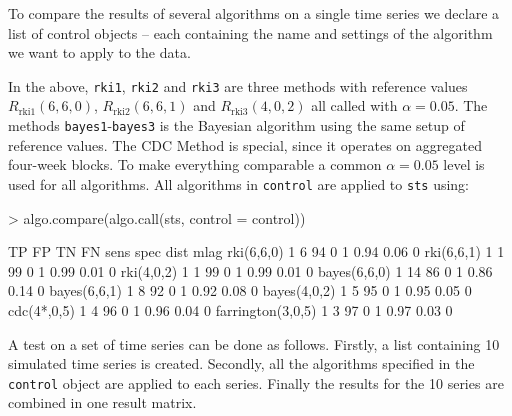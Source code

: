 \documentclass[a4paper,11pt]{article}
\begin{document}
To compare the results of several algorithms on a single time series
we declare a list of control objects -- each containing the name and
settings of the algorithm we want to apply to the data.
\begin{Schunk}
\end{Schunk}
%
In the above, \texttt{rki1}, \texttt{rki2} and \texttt{rki3} are three
methods with reference values $R_\text{rki1}(6,6,0)$,
$R_\text{rki2}(6,6,1)$ and $R_\text{rki3}(4,0,2)$ all called with
$\alpha=0.05$. The methods \texttt{bayes1}-\texttt{bayes3} is the
Bayesian algorithm using the same setup of reference values. The CDC
Method is special, since it operates on aggregated four-week blocks.
To make everything comparable a common $\alpha=0.05$ level is used for
all algorithms. All algorithms in \texttt{control} are applied to
\texttt{sts} using:
\begin{Schunk}
\begin{Sinput}
> algo.compare(algo.call(sts, control = control))
\end{Sinput}
\end{Schunk}
\begin{Schunk}
\begin{Soutput}
                  TP FP TN FN sens spec dist mlag
rki(6,6,0)        1  6  94 0  1    0.94 0.06 0   
rki(6,6,1)        1  1  99 0  1    0.99 0.01 0   
rki(4,0,2)        1  1  99 0  1    0.99 0.01 0   
bayes(6,6,0)      1  14 86 0  1    0.86 0.14 0   
bayes(6,6,1)      1  8  92 0  1    0.92 0.08 0   
bayes(4,0,2)      1  5  95 0  1    0.95 0.05 0   
cdc(4*,0,5)       1  4  96 0  1    0.96 0.04 0   
farrington(3,0,5) 1  3  97 0  1    0.97 0.03 0   
\end{Soutput}
\end{Schunk}


A test on a set of time series can be done as follows. Firstly, a list
containing 10 simulated time series is created. Secondly, all the
algorithms specified in the \texttt{control} object are applied to
each series. Finally the results for the 10 series are combined in one
result matrix.
\end{document}
